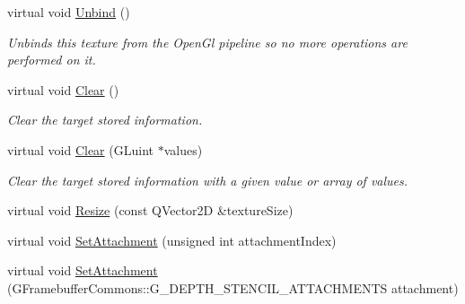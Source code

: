 \begin{DoxyCompactItemize}
\mbox{\label{class_geometry_engine_1_1_geometry_buffer_1_1_g_depth_stencil_texture_a52010a4029d0c2d3979489521de9dd8a}} 
virtual void \mbox{\hyperlink{class_geometry_engine_1_1_geometry_buffer_1_1_g_depth_stencil_texture_a52010a4029d0c2d3979489521de9dd8a}{Unbind}} ()
\begin{DoxyCompactList}\small\item\em Unbinds this texture from the Open\+Gl pipeline so no more operations are performed on it. \end{DoxyCompactList}\item 
\mbox{\label{class_geometry_engine_1_1_geometry_buffer_1_1_g_depth_stencil_texture_a1c2958f76446e543c7fac756fca00428}} 
virtual void \mbox{\hyperlink{class_geometry_engine_1_1_geometry_buffer_1_1_g_depth_stencil_texture_a1c2958f76446e543c7fac756fca00428}{Clear}} ()
\begin{DoxyCompactList}\small\item\em Clear the target stored information. \end{DoxyCompactList}\item 
\mbox{\label{class_geometry_engine_1_1_geometry_buffer_1_1_g_depth_stencil_texture_a4ef2c74391c1cc0b7ea98fe125f7b8ac}} 
virtual void \mbox{\hyperlink{class_geometry_engine_1_1_geometry_buffer_1_1_g_depth_stencil_texture_a4ef2c74391c1cc0b7ea98fe125f7b8ac}{Clear}} (G\+Luint $\ast$values)
\begin{DoxyCompactList}\small\item\em Clear the target stored information with a given value or array of values. \end{DoxyCompactList}\item 
virtual void \mbox{\hyperlink{class_geometry_engine_1_1_geometry_buffer_1_1_g_depth_stencil_texture_a692ca73521e51be802c981ab05029369}{Resize}} (const Q\+Vector2D \&texture\+Size)
\item 
virtual void \mbox{\hyperlink{class_geometry_engine_1_1_geometry_buffer_1_1_g_depth_stencil_texture_aa4b676746b13f4ea748450ea19ca711a}{Set\+Attachment}} (unsigned int attachment\+Index)
\item 
virtual void \mbox{\hyperlink{class_geometry_engine_1_1_geometry_buffer_1_1_g_depth_stencil_texture_ae8d0ace073861e957f5abe264d2c321d}{Set\+Attachment}} (G\+Framebuffer\+Commons\+::\+G\+\_\+\+D\+E\+P\+T\+H\+\_\+\+S\+T\+E\+N\+C\+I\+L\+\_\+\+A\+T\+T\+A\+C\+H\+M\+E\+N\+TS attachment)

\end{DoxyCompactItemize}
